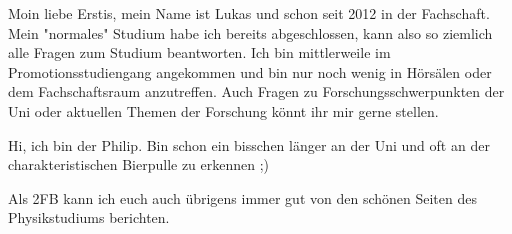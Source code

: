 \begin{multicols*}{2}
{Moin liebe Erstis,
	mein Name ist Lukas und schon seit 2012 in der Fachschaft. Mein "normales" Studium habe ich bereits abgeschlossen, kann also so ziemlich alle Fragen zum Studium beantworten.
	Ich bin mittlerweile im Promotionsstudiengang angekommen und bin nur noch wenig in Hörsälen oder dem Fachschaftsraum anzutreffen.
	Auch Fragen zu Forschungsschwerpunkten der Uni oder aktuellen Themen der Forschung könnt ihr mir gerne stellen.}



{Hi, ich bin der Philip. Bin schon ein bisschen länger an der Uni und oft an der charakteristischen Bierpulle zu erkennen ;)
	
	Als 2FB kann ich euch auch übrigens immer gut von den schönen Seiten des Physikstudiums berichten.
	\vspace{\baselineskip}}



\end{multicols*}
